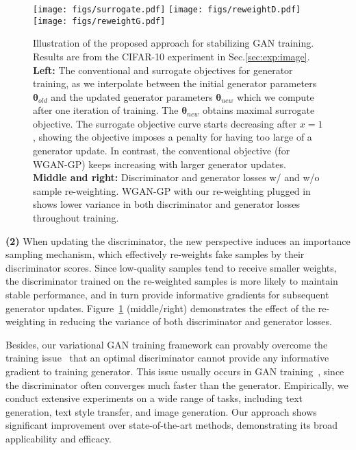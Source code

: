 \documentclass{article}
\newcommand{\0}{\bm{0}}
\newcommand{\wm}{\bm{\theta}}
\begin{document}
\begin{figure}[t]
\begin{center}
\centerline{
\texttt{[image: figs/surrogate.pdf]}
\texttt{[image: figs/reweightD.pdf]}
\texttt{[image: figs/reweightG.pdf]}
}
\vspace{-4pt}
\caption{
Illustration of the proposed approach for stabilizing GAN training. Results are from the CIFAR-10 experiment in Sec.\ref{sec:exp:image}.
{\bf Left:} The conventional and surrogate objectives for generator training, as we interpolate between the initial generator parameters $\wm_{old}$ and the updated generator parameters $\wm_{new}$ which we compute after one iteration of training. The $\wm_{new}$ obtains maximal surrogate objective. 
The surrogate objective curve starts decreasing after $x=1$, showing the objective imposes a penalty for having too large of a generator update. In contrast, the conventional objective (for WGAN-GP) keeps increasing with larger generator updates. 
{\bf Middle and right:} Discriminator and generator losses w/ and w/o sample re-weighting. 
WGAN-GP with our re-weighting plugged in shows lower variance in both discriminator and generator losses throughout training. 
}
\label{fig:intro-stability}
\end{center}
\vspace{-6mm}
\end{figure}



{\bf (2)} When updating the discriminator, the new perspective induces an importance sampling mechanism, which effectively re-weights fake samples by their discriminator scores. Since low-quality samples tend to receive smaller weights, the discriminator trained on the re-weighted samples is more likely to maintain stable performance, and in turn provide informative gradients for subsequent generator updates. Figure~\ref{fig:intro-stability} (middle/right) demonstrates the effect of the re-weighting in reducing the variance of both discriminator and generator losses. 


Besides, our variational GAN training framework can provably overcome the training issue~\cite{lipschitz} that an optimal discriminator cannot provide any  informative gradient to training generator. This issue usually occurs in GAN training~\cite{lipschitz}, since the discriminator often converges much faster than the generator. Empirically, we conduct extensive experiments on a wide range of tasks, including text generation, text style transfer, and image generation. Our approach shows significant improvement over state-of-the-art methods, demonstrating its broad applicability and efficacy.
\end{document}
